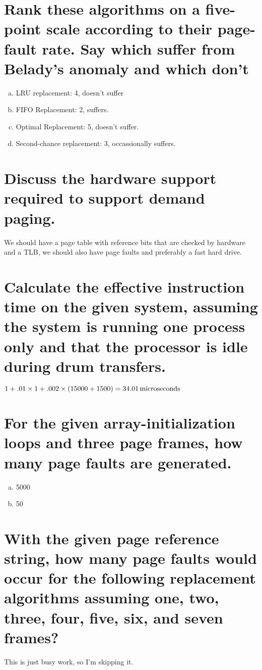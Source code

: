 \documentclass{book}%
\begin{document}
\section{Rank these algorithms on a five-point scale according to their
page-fault rate. Say which suffer from Belady's anomaly and which don't}
\begin{enumerate}[(a)]
\item LRU replacement: 4, doesn't suffer
\item FIFO Replacement: 2, suffers.
\item Optimal Replacement: 5, doesn't suffer.
\item Second-chance replacement: 3, occassionally suffers. 
\end{enumerate}
\section{Discuss the hardware support required to support demand paging.}
We should have a page table with reference bits that are checked by hardware and
a TLB, we should also have page faults and preferably a fast hard drive.
\section{Calculate the effective instruction time on the given system, assuming
the system is running one process only and that the processor is idle during
drum transfers.}
$1+.01\times1+.002\times(15000+1500)=\unit[34.01]{microseconds}$
\section{For the given array-initialization loops and three page frames, how
many page faults are generated.}
\begin{enumerate}[a.]
\item 5000
\item 50
\end{enumerate}
\section{With the given page reference string, how many page faults would occur
for the following replacement algorithms assuming one, two, three, four, five,
six, and seven frames?}
This is just busy work, so I'm skipping it.
\end{document}
